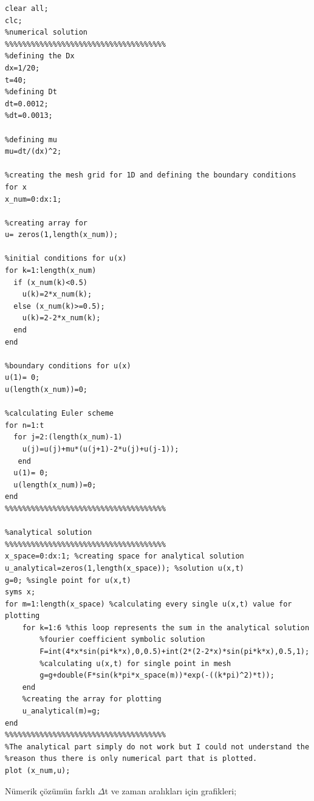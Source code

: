 \documentclass[paper=a4, fontsize=11pt]{scrartcl} %
\numberwithin{equation}{section} %
\numberwithin{figure}{section} %
\numberwithin{table}{section} %
\begin{document}
\begin{lstlisting}
clear all;
clc;
%numerical solution
%%%%%%%%%%%%%%%%%%%%%%%%%%%%%%%%%%%%%
%defining the Dx
dx=1/20;
t=40;
%defining Dt 
dt=0.0012; 
%dt=0.0013;

%defining mu
mu=dt/(dx)^2;

%creating the mesh grid for 1D and defining the boundary conditions for x
x_num=0:dx:1;

%creating array for 
u= zeros(1,length(x_num));

%initial conditions for u(x)
for k=1:length(x_num)
  if (x_num(k)<0.5)
    u(k)=2*x_num(k);
  else (x_num(k)>=0.5);
    u(k)=2-2*x_num(k);
  end
end

%boundary conditions for u(x)
u(1)= 0;
u(length(x_num))=0;

%calculating Euler scheme
for n=1:t
  for j=2:(length(x_num)-1)
    u(j)=u(j)+mu*(u(j+1)-2*u(j)+u(j-1));
   end
  u(1)= 0;
  u(length(x_num))=0;
end
%%%%%%%%%%%%%%%%%%%%%%%%%%%%%%%%%%%%%

%analytical solution
%%%%%%%%%%%%%%%%%%%%%%%%%%%%%%%%%%%%%
x_space=0:dx:1; %creating space for analytical solution
u_analytical=zeros(1,length(x_space)); %solution u(x,t)
g=0; %single point for u(x,t)
syms x;
for m=1:length(x_space) %calculating every single u(x,t) value for plotting
    for k=1:6 %this loop represents the sum in the analytical solution
        %fourier coefficient symbolic solution
        F=int(4*x*sin(pi*k*x),0,0.5)+int(2*(2-2*x)*sin(pi*k*x),0.5,1);
        %calculating u(x,t) for single point in mesh
        g=g+double(F*sin(k*pi*x_space(m))*exp(-((k*pi)^2)*t)); 
    end
    %creating the array for plotting
    u_analytical(m)=g;
end
%%%%%%%%%%%%%%%%%%%%%%%%%%%%%%%%%%%%%
%The analytical part simply do not work but I could not understand the
%reason thus there is only numerical part that is plotted.
plot (x_num,u);
\end{lstlisting}
\fi
N\"umerik \c{c}\"oz\"um\"un farkl{\i} $\Delta$t ve zaman aral{\i}klar{\i} i\c{c}in grafikleri;
\end{document}
